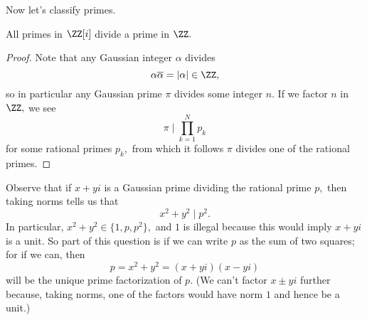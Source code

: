 \documentclass[../notes.tex]{subfiles}
\begin{document}
Now let's classify primes.
\begin{lemma} \label{lem:pliesoverp}
	All primes in $\ZZ[i]$ divide a prime in $\ZZ.$
\end{lemma}
\begin{proof}
	Note that any Gaussian integer $\alpha$ divides 
	\[\alpha\overline\alpha=|\alpha|\in\ZZ,\]
	so in particular any Gaussian prime $\pi$ divides some integer $n.$ If we factor $n$ in $\ZZ,$ we see
	\[\pi\mid\prod_{k=1}^Np_k\]
	for some rational primes $p_k,$ from which it follows $\pi$ divides one of the rational primes.
\end{proof}
Observe that if $x+yi$ is a Gaussian prime dividing the rational prime $p,$ then taking norms tells us that
\[x^2+y^2\mid p^2.\]
In particular, $x^2+y^2\in\{1,p,p^2\},$ and $1$ is illegal because this would imply $x+yi$ is a unit. So part of this question is if we can write $p$ as the sum of two squares; for if we can, then
\[p=x^2+y^2=(x+yi)(x-yi)\]
will be the unique prime factorization of $p.$ (We can't factor $x\pm yi$ further because, taking norms, one of the factors would have norm $1$ and hence be a unit.)
\end{document}
